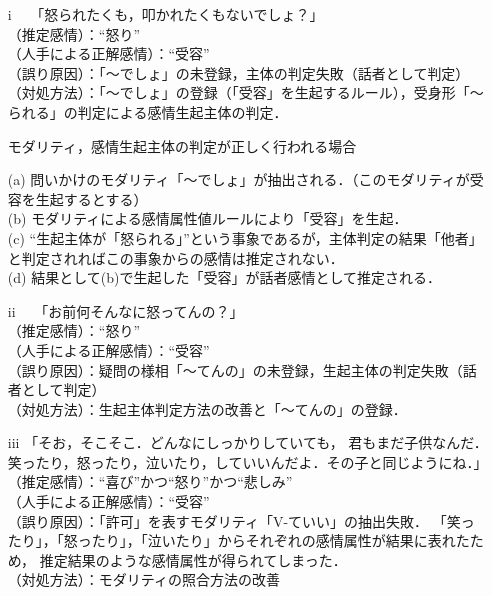 \documentclass[japanese]{jnlp_1.3c}
\begin{document}
\begin{itemize}
\begin{itemize}
\item [i] \ \ 「怒られたくも，叩かれたくもないでしょ？」 \\ 
\hspace{0.3cm}（推定感情）：“怒り”\\
\hspace{0.3cm}（人手による正解感情）：“受容”\\
\hspace{0.3cm}（誤り原因）：「〜でしょ」の未登録，主体の判定失敗（話者として判定） \\
\hspace{0.3cm}（対処方法）：「〜でしょ」の登録（「受容」を生起するルール），受身形「〜られる」の判定による感情生起主体の判定．\\

\begin{itembox}{モダリティ，感情生起主体の判定が正しく行われる場合}

(a) 問いかけのモダリティ「〜でしょ」が抽出される．（このモダリティが受容を生起するとする）\\
(b) モダリティによる感情属性値ルールにより「受容」を生起．\\
(c) “生起主体が「怒られる」”という事象であるが，主体判定の結果「他者」と判定されればこの事象からの感情は推定されない． \\
(d) 結果として(b)で生起した「受容」が話者感情として推定される．

\end{itembox}
\item [ii] \ \ 「お前何そんなに怒ってんの？」 \\
\hspace{0.3cm}（推定感情）：“怒り”\\
\hspace{0.3cm}（人手による正解感情）：“受容”\\
\hspace{0.3cm}（誤り原因）：疑問の様相「〜てんの」の未登録，生起主体の判定失敗（話者として判定） \\
\hspace{0.3cm}（対処方法）：生起主体判定方法の改善と「〜てんの」の登録．\\

\item [iii] 「そお，そこそこ．どんなにしっかりしていても，
君もまだ子供なんだ．笑ったり，怒ったり，泣いたり，していいんだよ．その子と同じようにね．」\\
\hspace{0.3cm}（推定感情）：“喜び”かつ“怒り”かつ“悲しみ”\\
\hspace{0.3cm}（人手による正解感情）：“受容”\\
\hspace{0.3cm}（誤り原因）：「許可」を表すモダリティ「V-ていい」の抽出失敗．
「笑ったり」，「怒ったり」，「泣いたり」からそれぞれの感情属性が結果に表れたため，
推定結果のような感情属性が得られてしまった．\\
\hspace{0.3cm}（対処方法）：モダリティの照合方法の改善 \\


\end{itemize}
\end{itemize}
\end{document}
